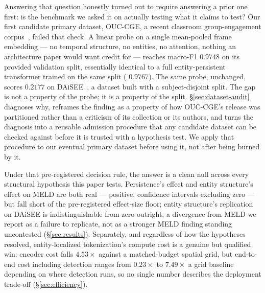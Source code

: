 Answering that question honestly turned out to require answering a
prior one first: is the benchmark we asked it on actually testing what it
claims to test? Our first candidate primary dataset, OUC-CGE, a recent
classroom group-engagement corpus~\cite{lu2025ouccge}, failed that check. A
linear probe on a single mean-pooled frame embedding --- no temporal
structure, no entities, no attention, nothing an architecture paper would
want credit for --- reaches
macro-F1 $0.9748$ on its provided validation split, essentially identical to
a full entity-persistent transformer trained on the
same split (
$0.9767$). The same probe, unchanged, scores
$0.2177$ on DAiSEE~\cite{gupta2016daisee}, a dataset built with a
subject-disjoint split. The gap is not a property of the probe; it is a
property of the split. \S\ref{sec:dataset-audit} diagnoses why, reframes the
finding as a property of how OUC-CGE's release was partitioned rather than a
criticism of its collection or its authors, and turns the diagnosis into a
reusable admission procedure that any candidate dataset can be checked
against before it is trusted with a hypothesis test. We apply that procedure
to our eventual primary dataset before using it, not after being burned by
it.

Under that pre-registered decision rule, the answer is a clean null across
every structural hypothesis this paper tests. Persistence's effect and
entity structure's effect on MELD are both real --- positive, confidence
intervals excluding zero --- but fall short of the pre-registered
effect-size floor; entity structure's replication on DAiSEE is
indistinguishable from zero outright, a divergence from MELD we report as a
failure to replicate, not as a stronger MELD finding standing uncontested
(\S\ref{sec:results}). Separately, and regardless of how the hypotheses
resolved, entity-localized tokenization's compute cost is a genuine but
qualified win: encoder cost falls $4.53\times$ against a matched-budget
spatial grid, but end-to-end cost including detection ranges from
$0.23\times$ to $7.49\times$ a grid baseline depending on where detection
runs, so no single number describes the deployment trade-off
(\S\ref{sec:efficiency}).

